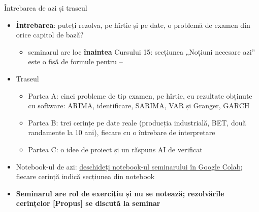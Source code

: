 \begin{frame}{Întrebarea de azi și traseul}
\itemsize{\small}
\begin{itemize}
    \item \textbf{Întrebarea}: puteți rezolva, pe hîrtie și pe date, o problemă de examen din orice capitol de bază?
    \begin{itemize}
        \item seminarul are loc \textbf{înaintea} Cursului 15: secțiunea „Noțiuni necesare azi” este o fișă de formule pentru --
    \end{itemize}
    \item Traseul
    \begin{itemize}
        \item Partea A: cinci probleme de tip examen, pe hîrtie, cu rezultate obținute cu software: ARIMA, identificare, SARIMA, VAR și Granger, GARCH
        \item Partea B: trei cerințe pe date reale (producția industrială, BET, două randamente la 10 ani), fiecare cu o întrebare de interpretare
        \item Partea C: o idee de proiect și un răspuns AI de verificat
    \end{itemize}
    \item Notebook-ul de azi: \href{\nb}{deschideți notebook-ul seminarului în Google Colab}; fiecare cerință indică secțiunea din notebook
    \item \textbf{Seminarul are rol de exercițiu și nu se notează; rezolvările cerințelor [Propus] se discută la seminar}
\end{itemize}
\end{frame}

